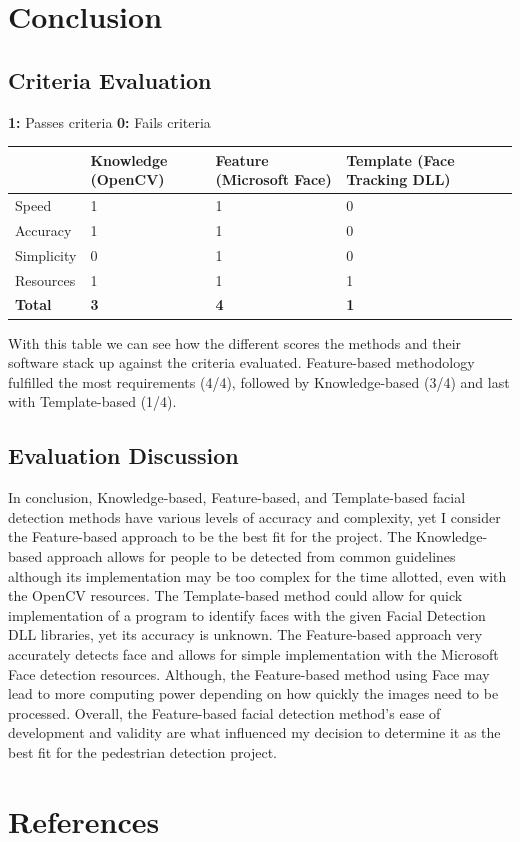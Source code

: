\documentclass[onecolumn, draftclsnofoot,10pt, compsoc]{IEEEtran}
\begin{document}
\section{Conclusion}
\subsection{Criteria Evaluation}
\textbf{1:} Passes criteria \textbf{0:} Fails criteria
    \begin{center}
    \begin{tabular}{|l|l|l|l|l|l|}
    \hline
               & \textbf{Knowledge (OpenCV)} & \textbf{Feature (Microsoft Face)} & \textbf{Template (Face Tracking DLL)} \\ \hline
    Speed &     1      &      1     &      0 \\ \hline
    Accuracy &     1      &     1      &      0  \\ \hline
    Simplicity &     0      &     1      &     0  \\ \hline
    Resources &      1     &     1      &   1  \\ \hline
    \textbf{Total} &      \textbf{3}     &   \textbf{4}        &      \textbf{1} \\ \hline 
    \end{tabular}
\end{center}
With this table we can see how the different scores the methods and their software stack up against the criteria evaluated. Feature-based methodology fulfilled the most requirements (4/4), followed by Knowledge-based (3/4) and last with Template-based (1/4). 

\subsection{Evaluation Discussion}
In conclusion, Knowledge-based, Feature-based, and Template-based facial detection methods have various levels of accuracy and complexity, yet I consider the Feature-based approach to be the best fit for the project. The Knowledge-based approach allows for people to be detected from common guidelines although its implementation may be too complex for the time allotted, even with the OpenCV resources. The Template-based method could allow for quick implementation of a program to identify faces with the given Facial Detection DLL libraries, yet its accuracy is unknown. The Feature-based approach very accurately detects face and allows for simple implementation with the Microsoft Face detection resources. Although, the Feature-based method using Face may lead to more computing power depending on how quickly the images need to be processed. Overall, the Feature-based facial detection method's ease of development and validity are what influenced my decision to determine it as the best fit for the pedestrian detection project.

\section{References}
\let\oldaddcontentsline\addcontentsline%
\renewcommand{\addcontentsline}[3]{}%
  

\let\addcontentsline\oldaddcontentsline%
\end{document}
